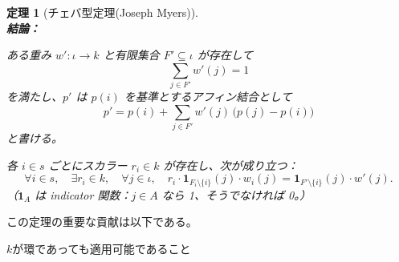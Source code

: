 \documentclass[a4paper,12pt]{bxjsbook}
\newlength{\customindent}
\newenvironment{body}{
  \par
  \begingroup
  \setlength{\leftskip}{\customindent}
  \setlength{\rightskip}{0pt}
  \setlength{\parindent}{1em}
  \setlength{\displayindent}{\customindent}
  \setlength{\displaywidth}{\dimexpr\linewidth-\customindent\relax}
}{
  \par
  \endgroup
}
\theoremstyle{theorem}
\newtheorem{theorem}{定理}[chapter]
\begin{document}
\begin{body}
\begin{theorem}[チェバ型定理(Joseph Myers)]
        \noindent\textbf{\\結論：}\par
        \begin{theoremenumerate}[label=(C\arabic*), leftmargin=4em, topsep=2pt, partopsep=0pt, itemsep=0pt, parsep=0pt]
            \item ある重み $w' : \iota \to k$ と有限集合 $F' \subseteq \iota$ が存在して
            \[
            \sum_{j \in F'} w'(j) = 1
            \]
            を満たし、$p'$ は $p(i)$ を基準とするアフィン結合として
            \[
            p' = p(i) + \sum_{j \in F'} w'(j)\,\bigl(p(j) - p(i)\bigr)
            \]
            と書ける。
            \item 各 $i \in s$ ごとにスカラー $r_i \in k$ が存在し、次が成り立つ：
            \[
            \forall i \in s, \quad \exists r_i \in k, \quad \forall j \in \iota, \quad r_i \cdot \mathbf{1}_{F_i \setminus \{i\}}(j) \cdot w_i(j) = \mathbf{1}_{F' \setminus \{i\}}(j) \cdot w'(j).
            \]
            （$\mathbf{1}_A$ は indicator 関数：$j \in A$ なら 1、そうでなければ 0。）
        \end{theoremenumerate}
    \end{theorem}

    \begin{body}
        \indent この定理の重要な貢献は以下である。
        \begin{bodyitemize}
            \item $k$が環であっても適用可能であること
        \end{bodyitemize}
    \end{body}


\end{body}
\end{document}
